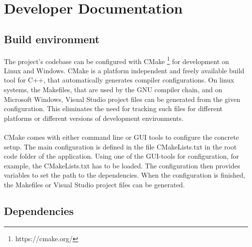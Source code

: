 \section{Developer Documentation}\label{sec:devdoc}


\subsection{Build environment}

The project’s codebase can be configured with CMake \footnote{https://cmake.org/} for development on Linux and Windows. CMake is a platform independent and freely available build tool for C++, that automatically generates compiler configurations. On linux systems, the Makefiles, that are used by the GNU compiler chain, and on Microsoft Windows, Visual Studio project files can be generated from the given configuration. This eliminates the need for tracking such files for different platforms or different versions of development environments.
\\
\\
CMake comes with either command line or GUI tools to configure the concrete setup. The main configuration is defined in the file CMakeLists.txt in the root code folder of the application. Using one of the GUI-tools for configuration, for example, the CMakeLists.txt has to be loaded. The configuration then provides variables to set the path to the dependencies. When the configuration is finished, the Makefiles or Visual Studio project files can be generated.


\subsection{Dependencies}

